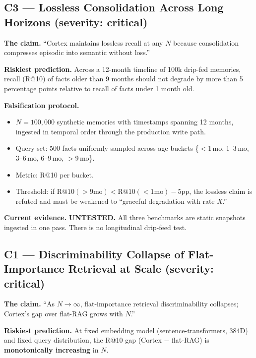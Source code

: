 \documentclass[11pt]{article}
\begin{document}
\subsection{C3 --- Lossless Consolidation Across Long Horizons (severity: critical)}
\label{app:popper-c3}

\textbf{The claim.} ``Cortex maintains lossless recall at any $N$
because consolidation compresses episodic into semantic without
loss.''

\textbf{Riskiest prediction.}  Across a 12-month timeline of 100k
drip-fed memories, recall (R@10) of facts older than 9 months
should not degrade by more than 5 percentage points relative to
recall of facts under 1 month old.

\textbf{Falsification protocol.}
\begin{itemize}
  \item $N = 100{,}000$ synthetic memories with timestamps spanning
        12 months, ingested in temporal order through the
        production write path.
  \item Query set: 500 facts uniformly sampled across age buckets
        \{$<$1\,mo, 1--3\,mo, 3--6\,mo, 6--9\,mo, $>$9\,mo\}.
  \item Metric: R@10 per bucket.
  \item Threshold: if
        $\mathrm{R@10}({>}9\mathrm{mo}) <
         \mathrm{R@10}({<}1\mathrm{mo}) - 5\mathrm{pp}$, the
        lossless claim is refuted and must be weakened to
        ``graceful degradation with rate $X$.''
\end{itemize}

\textbf{Current evidence.} \textbf{UNTESTED.}  All three benchmarks
are static snapshots ingested in one pass.  There is no
longitudinal drip-feed test.

\subsection{C1 --- Discriminability Collapse of Flat-Importance Retrieval at Scale (severity: critical)}
\label{app:popper-c1}

\textbf{The claim.} ``As $N \to \infty$, flat-importance retrieval
discriminability collapses; Cortex's gap over flat-RAG grows with
$N$.''

\textbf{Riskiest prediction.}  At fixed embedding model
(sentence-transformers, 384D) and fixed query distribution, the
R@10 gap (Cortex $-$ flat-RAG) is \textbf{monotonically increasing}
in $N$.
\end{document}
